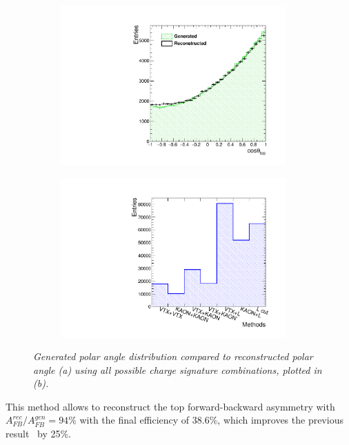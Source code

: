 \begin{figure}
	\centering
	\begin{subfigure}{0.5\textwidth}
		\includegraphics[width=0.95\textwidth]{ILD/plots/top-asymmetry-lepton.pdf}
		\caption{\label{fig:TopAsymmetryChi_a_3} }
	\end{subfigure}%
	\begin{subfigure}{0.5\textwidth}
		\centering
		\includegraphics[width=0.95\textwidth]{ILD/plots/top-methods-lepton.pdf}
		\caption{\label{fig:TopAsymmetryChi_b_3} }
	\end{subfigure}
	\caption{\sl Generated polar angle distribution compared to reconstructed polar angle (a) using all possible charge signature combinations, plotted in (b). }
	\label{fig:TopAsymmetryChi_3}
\end{figure}

This method allows to reconstruct the top forward-backward asymmetry with $A_{FB}^{rec}/A^{gen}_{FB} = 94\%$ with the final efficiency of 38.6\%, which improves the previous result~\cite{bib:ILCTOP} by 25\%. 

